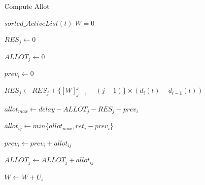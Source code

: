 	\label{algouedf}
	\begin{algorithm}[H]
		\caption{Compute Allot}
		\begin{algorithmic}
			\REQUIRE $sorted\_ActiveList(t)$
			\STATE $W = 0$
			
				\item $RES_j \leftarrow 0$
				\item $ALLOT_j \leftarrow 0$
			\ENDFOR
	
				\item $prev_i \leftarrow 0$
					\item $RES_j \leftarrow RES_j + \{[W]_{j-1}^{j} - (j - 1)\}\times (d_i(t) - d_{i-1}(t))$
					\item $allot_{max} \leftarrow delay - ALLOT_j - RES_j - prev_i$
					\item $allot_{ij} \leftarrow min\{allot_{max}, ret_i - prev_i\}$
					\item $prev_i \leftarrow prev_i + allot_{ij}$
					\item $ALLOT_j \leftarrow ALLOT_j + allot_{ij}$
				\ENDFOR
				\item $W \leftarrow W + U_i$
			\ENDFOR
		\end{algorithmic}
	\end{algorithm}
	
